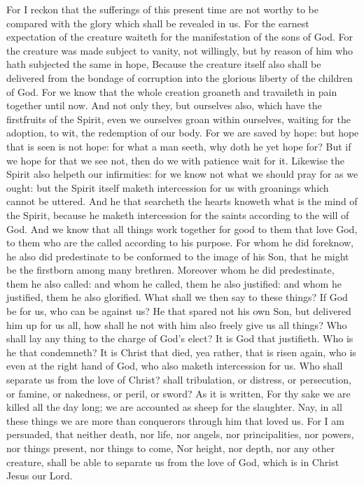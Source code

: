  For I reckon that the sufferings of this present time are
not worthy to be compared with the glory which shall be revealed in us.
 For the earnest expectation of the creature waiteth for
the manifestation of the sons of God.  For the creature was
made subject to vanity, not willingly, but by reason of him who hath
subjected the same in hope,  Because the creature itself
also shall be delivered from the bondage of corruption into the glorious
liberty of the children of God.  For we know that the whole
creation groaneth and travaileth in pain together until now.
 And not only they, but ourselves also, which have the
firstfruits of the Spirit, even we ourselves groan within ourselves,
waiting for the adoption, to wit, the redemption of our body.
 For we are saved by hope: but hope that is seen is not
hope: for what a man seeth, why doth he yet hope for?  But
if we hope for that we see not, then do we with patience wait for it.
 Likewise the Spirit also helpeth our infirmities: for we
know not what we should pray for as we ought: but the Spirit itself
maketh intercession for us with groanings which cannot be uttered.
 And he that searcheth the hearts knoweth what is the mind
of the Spirit, because he maketh intercession for the saints according
to the will of God.  And we know that all things work
together for good to them that love God, to them who are the called
according to his purpose.  For whom he did foreknow, he
also did predestinate to be conformed to the image of his Son, that he
might be the firstborn among many brethren.  Moreover whom
he did predestinate, them he also called: and whom he called, them he
also justified: and whom he justified, them he also glorified.
 What shall we then say to these things? If God be for us,
who can be against us?  He that spared not his own Son, but
delivered him up for us all, how shall he not with him also freely give
us all things?  Who shall lay any thing to the charge of
God's elect? It is God that justifieth.  Who is he that
condemneth? It is Christ that died, yea rather, that is risen again, who
is even at the right hand of God, who also maketh intercession for us.
 Who shall separate us from the love of Christ? shall
tribulation, or distress, or persecution, or famine, or nakedness, or
peril, or sword?  As it is written, For thy sake we are
killed all the day long; we are accounted as sheep for the slaughter.
 Nay, in all these things we are more than conquerors
through him that loved us.  For I am persuaded, that
neither death, nor life, nor angels, nor principalities, nor powers, nor
things present, nor things to come,  Nor height, nor depth,
nor any other creature, shall be able to separate us from the love of
God, which is in Christ Jesus our Lord.

